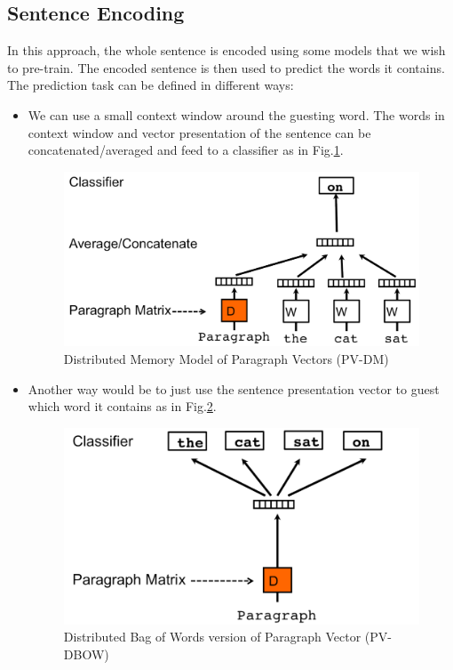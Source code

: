 \subsection{Sentence Encoding}
In this approach, the whole sentence is encoded using some models that we wish to pre-train.
The encoded sentence is then used to predict the words it contains.
The prediction task can be defined in different ways:
\begin{itemize}
\item We can use a small context window around the guesting word.
The words in context window and vector presentation of the sentence can be concatenated/averaged and feed to a classifier as in Fig.\ref{fig:para-vec-1}.

\begin{figure}[H]
    \centering    \includegraphics[scale=0.3]{figure/para-vec-1}
    \caption[Distributed Memory Model of Paragraph Vectors (PV-DM)]{Distributed Memory Model of Paragraph Vectors (PV-DM)~\cite{ParagraphVec}}
    \label{fig:para-vec-1}
\end{figure}

\item Another way would be to just use the sentence presentation vector to guest which word it contains as in Fig.\ref{fig:para-vec-2}.

\begin{figure}[H]
    \centering    \includegraphics[scale=0.3]{figure/para-vec-2}
    \caption[Distributed Bag of Words version of Paragraph Vector (PV-DBOW)]{Distributed Bag of Words version of Paragraph Vector (PV-DBOW)~\cite{ParagraphVec}}
    \label{fig:para-vec-2}
\end{figure}


\end{itemize}
